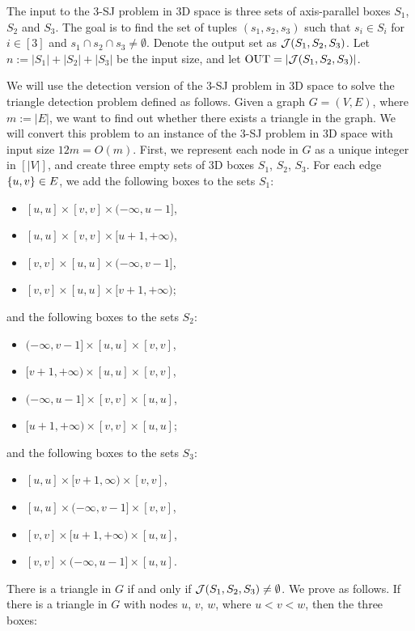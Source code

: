 The input to the 3-SJ problem in 3D space is three sets of axis-parallel boxes $S_1$, $S_2$ and $S_3$. 
The goal is to find the set of tuples $(s_1,s_2,s_3)$ such that $s_i \in S_i$ for $i \in [3]$ and $s_1 \cap s_2 \cap s_3 \neq \emptyset$. Denote the output set as $\mathcal{J}(S_1,S_2,S_3)$.
Let $n:=|S_1|+|S_2|+|S_3|$ be the input size, and let $\mathrm{OUT} = |\mathcal{J}(S_1,S_2,S_3)|$.

We will use the detection version of the 3-SJ problem in 3D space to solve the triangle detection problem defined as follows. Given a graph $G = (V,E)$, where $m:=|E|$, we want to find out whether there exists a triangle in the graph. We will convert this problem to an instance of the 3-SJ problem in 3D space with input size $12m=O(m)$. First, we represent each node in $G$ as a unique integer in $[|V|]$, and create three empty sets of 3D boxes $S_1$, $S_2$, $S_3$. For each edge $\{u,v\}\in E$, we add the following boxes to the sets $S_1$:
\begin{itemize}
    \item $[u,u]\times [v,v]\times(-\infty,u-1]$,
    \item $[u,u]\times [v,v]\times[u+1,+\infty)$,
    \item $[v,v]\times [u,u] \times (-\infty,v-1]$,
    \item $[v,v]\times [u,u] \times [v+1,+\infty)$;
\end{itemize}
and the following boxes to the sets $S_2$:
\begin{itemize}
    \item $(-\infty,v-1]\times[u,u]\times [v,v]$,
    \item $[v+1,+\infty)\times[u,u]\times [v,v]$,
    \item $(-\infty,u-1] \times[v,v]\times [u,u]$,
    \item $ [u+1,+\infty)\times [v,v]\times [u,u]$;
\end{itemize}
and the following boxes to the sets $S_3$:
\begin{itemize}
    \item $[u,u]\times[v+1,\infty)\times [v,v]$,
    \item $[u,u]\times(-\infty,v-1]\times [v,v]$,
    \item $[v,v]\times[u+1,+\infty)\times [u,u]$,
    \item $[v,v]\times(-\infty,u-1]\times [u,u]$.
\end{itemize}
There is a triangle in $G$ if and only if $\mathcal{J}(S_1,S_2,S_3) \neq \emptyset$. We prove as follows. If there is a triangle in $G$ with nodes $u$, $v$, $w$, where $u < v < w$, then the three boxes:
